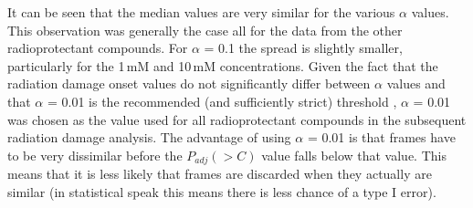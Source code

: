 It can be seen that the median values are very similar for the various $\alpha$ values.
This observation was generally the case all for the data from the other radioprotectant compounds.
For $\alpha$ = 0.1 the spread is slightly smaller, particularly for the 1$\,$mM and 10$\,$mM concentrations.
Given the fact that the radiation damage onset values do not significantly differ between $\alpha$ values and that $\alpha$ = 0.01 is the recommended (and sufficiently strict) threshold \cite{franke2015correlation}, $\alpha$ = 0.01 was chosen as the value used for all radioprotectant compounds in the subsequent radiation damage analysis.
The advantage of using $\alpha$ = 0.01 is that frames have to be very dissimilar before the $P_{adj}(>C)$ value falls below that value.
This means that it is less likely that frames are discarded when they actually are similar (in statistical speak this means there is less chance of a type I error).
